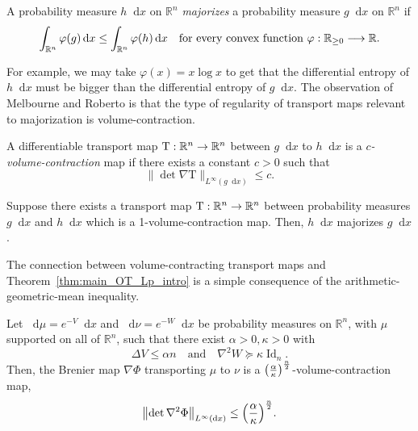 \documentclass[AHL,Unicode,longabstracts]{cedram}
\newcommand{\R}{\mathbb R}
\DeclareMathOperator{\Id}{Id}
\newcommand{\map}{\mathrm T}
\newcommand{\V}{V}
\newcommand{\W}{W}
\newcommand{\sta}{g}
\newcommand{\fin}{h}
\newcommand{\dd}{n}
\newcommand{\source}{\mu}
\newcommand{\target}{\nu}
\newcommand{\lsh}{\alpha}
\newcommand{\lc}{\kappa}
\newcommand*\diff{\mathop{}\!\mathrm{d}}
\newcommand{\OT}{\Phi}
\newcommand{\cxfun}{\varphi}
\renewcommand*{\to}{\mathchoice{\longrightarrow}{\rightarrow}{\rightarrow}{\rightarrow}}
\let\originalleft\left
\let\originalright\right
\renewcommand{\left}{\mathopen{}\mathclose\bgroup\originalleft}
\renewcommand{\right}{\aftergroup\egroup\originalright}
\begin{document}
\begin{defi}\label{def:majorization_intro}
A probability measure $\fin\diff x$ on $\R^{\dd}$ \emph{majorizes} a probability measure $\sta \diff x$ on $\R^{\dd}$ if
\[
\int_{\R^{\dd}} \cxfun(\sta)\diff x\le \int_{\R^{\dd}} \cxfun(\fin)\diff x\quad\text{for every convex function }\varphi:\R_{\ge 0} \to \R.
\]
\end{defi}

For example, we may take $\cxfun(x)=x\log x$ to get that the differential entropy of $\fin\diff x$ must be bigger than the differential entropy of $\sta\diff x$. The observation of Melbourne and Roberto is that the type of regularity of transport maps relevant to majorization is volume-contraction.

\begin{defi}
A differentiable transport map $\map:\R^{\dd}\to \R^{\dd}$ between $\sta\diff x$ to $\fin\diff x$ is a \emph{$c$-volume-contraction} map if there exists a constant $c>0$ such that
\[
\|\det\nabla \map\|_{L^{\infty}(\sta\diff x)}\le c.
\]
\end{defi}

\begin{theo}\label{thm:Melbourne-Roberto_intro}
Suppose there exists a transport map $\map:\R^{\dd}\to \R^{\dd}$ between probability measures $\sta\diff x$ and $\fin \diff x$ which is a 1-volume-contraction map. Then, $\fin\diff x$ majorizes $\sta \diff x$.
\end{theo}

The connection between volume-contracting transport maps and Theorem~\ref{thm:main_OT_Lp_intro} is a simple consequence of the arithmetic-geometric-mean inequality.

\begin{theo}\label{thm:volume-contraction_OT_intro}
Let $\diff\source=e^{-\V}\diff x$ and $\diff\target=e^{-\W}\diff x$ be probability measures on $\R^{\dd}$, with $\source$ supported on all of $\R^{\dd}$, such that there exist $\lsh>0,\lc>0$ with
\[
\Delta \V \le \lsh\dd \quad\text{and}\quad \nabla^2\W \succeq \lc \Id_{\dd}.
\]
Then, the Brenier map $\nabla\OT$ transporting $\source$ to $\target$ is a $\left(\frac{\lsh}{\lc}\right)^{\frac{\dd}{2}}$-volume-contraction map,
\begin{align}\label{eq:det_bound_main_intro}
\left\|\det\nabla^2\OT\right\|_{L^{\infty}(\diff x)}\le \left(\frac{\lsh}{\lc}\right)^{\frac{\dd}{2}}.
\end{align}
\end{theo}
\end{document}
